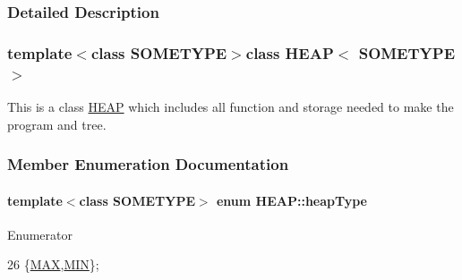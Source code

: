 \subsubsection{Detailed Description}
\subsubsection*{template$<$class S\+O\+M\+E\+T\+Y\+P\+E$>$class H\+E\+A\+P$<$ S\+O\+M\+E\+T\+Y\+P\+E $>$}

This is a class \hyperlink{classHEAP}{H\+E\+A\+P} which includes all function and storage needed to make the program and tree. 

\subsubsection{Member Enumeration Documentation}
\hypertarget{classHEAP_a440ecc6b7771102dbaa63b3dacce6c27}{
\paragraph[{heap\+Type}]{\setlength{\rightskip}{0pt plus 5cm}template$<$class S\+O\+M\+E\+T\+Y\+P\+E$>$ enum {\bf H\+E\+A\+P\+::heap\+Type}}}\label{classHEAP_a440ecc6b7771102dbaa63b3dacce6c27}
\begin{Desc}
\item[Enumerator]\par
\begin{description}
\item[{\em 
\hypertarget{classHEAP_a440ecc6b7771102dbaa63b3dacce6c27af40ccc5dc19d4acb72467707512926c6}{M\+A\+X}\label{classHEAP_a440ecc6b7771102dbaa63b3dacce6c27af40ccc5dc19d4acb72467707512926c6}
}]\item[{\em 
\hypertarget{classHEAP_a440ecc6b7771102dbaa63b3dacce6c27a38253c74a285d04166dcc555cb4c8f19}{M\+I\+N}\label{classHEAP_a440ecc6b7771102dbaa63b3dacce6c27a38253c74a285d04166dcc555cb4c8f19}
}]\end{description}
\end{Desc}

\begin{DoxyCode}
26 \{\hyperlink{classHEAP_a440ecc6b7771102dbaa63b3dacce6c27af40ccc5dc19d4acb72467707512926c6}{MAX},\hyperlink{classHEAP_a440ecc6b7771102dbaa63b3dacce6c27a38253c74a285d04166dcc555cb4c8f19}{MIN}\};
\end{DoxyCode}


